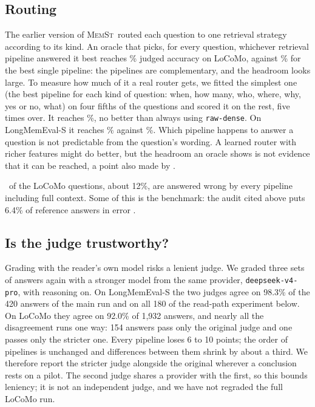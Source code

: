 \documentclass[11pt,letterpaper]{article}
\newcommand{\memst}{\textsc{MemSt}}
\newcommand{\pipe}[1]{\texttt{#1}}
\begin{document}
\begin{table}[ht]
\centering
\caption{LoCoMo: judged accuracy by category (number of questions in brackets). Adversarial questions are scored on abstention.}
\label{tab:categories}
\small
\resizebox{\textwidth}{!}{}
\end{table}

\subsection{Routing}

The earlier version of \memst\ routed each question to one retrieval strategy according to its kind. An oracle that picks, for every question, whichever retrieval pipeline answered it best reaches \numLocomoOracleJudged\% judged accuracy on LoCoMo, against \numLocomoBestSingleJudged\% for the best single pipeline: the pipelines are complementary, and the headroom looks large. To measure how much of it a real router gets, we fitted the simplest one (the best pipeline for each kind of question: when, how many, who, where, why, yes or no, what) on four fifths of the questions and scored it on the rest, five times over. It reaches \numLocomoRoutedJudged\%, no better than always using \pipe{raw-dense}. On LongMemEval-S it reaches \numLmeRoutedJudged\% against \numLmeBestSingleJudged\%. Which pipeline happens to answer a question is not predictable from the question's wording. A learned router with richer features might do better, but the headroom an oracle shows is not evidence that it can be reached, a point also made by \citet{huang2026harness}.

\numLocomoNobodyRight\ of the LoCoMo questions, about 12\%, are answered wrong by every pipeline including full context. Some of this is the benchmark: the audit cited above puts 6.4\% of reference answers in error \citep{locomoaudit}.

\subsection{Is the judge trustworthy?}
\label{sec:judge}

Grading with the reader's own model risks a lenient judge. We graded three sets of answers again with a stronger model from the same provider, \texttt{deepseek-v4-pro}, with reasoning on. On LongMemEval-S the two judges agree on 98.3\% of the 420 answers of the main run and on all 180 of the read-path experiment below. On LoCoMo they agree on 92.0\% of 1,932 answers, and nearly all the disagreement runs one way: 154 answers pass only the original judge and one passes only the stricter one. Every pipeline loses 6 to 10 points; the order of pipelines is unchanged and differences between them shrink by about a third. We therefore report the stricter judge alongside the original wherever a conclusion rests on a pilot. The second judge shares a provider with the first, so this bounds leniency; it is not an independent judge, and we have not regraded the full LoCoMo run.
\end{document}
